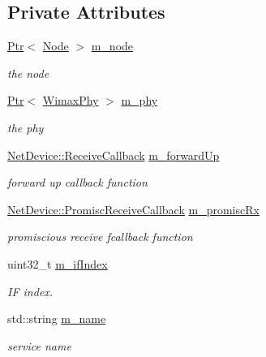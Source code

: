 \subsection*{Private Attributes}
\begin{DoxyCompactItemize}
\item 
\hyperlink{classns3_1_1Ptr}{Ptr}$<$ \hyperlink{classns3_1_1Node}{Node} $>$ \hyperlink{classns3_1_1WimaxNetDevice_ae164e0049ff0faa009a967b9e4757d92}{m\+\_\+node}
\begin{DoxyCompactList}\small\item\em the node \end{DoxyCompactList}\item 
\hyperlink{classns3_1_1Ptr}{Ptr}$<$ \hyperlink{classns3_1_1WimaxPhy}{Wimax\+Phy} $>$ \hyperlink{classns3_1_1WimaxNetDevice_a729df9652f39cacba57b0f527bc43f10}{m\+\_\+phy}
\begin{DoxyCompactList}\small\item\em the phy \end{DoxyCompactList}\item 
\hyperlink{classns3_1_1NetDevice_ad5e5e1ca187472bc2ba99575d8def568}{Net\+Device\+::\+Receive\+Callback} \hyperlink{classns3_1_1WimaxNetDevice_a03ea4a9669650b76bd7411e2c6811aea}{m\+\_\+forward\+Up}
\begin{DoxyCompactList}\small\item\em forward up callback function \end{DoxyCompactList}\item 
\hyperlink{classns3_1_1NetDevice_a427225795919f26c414bee2ea3f31ed2}{Net\+Device\+::\+Promisc\+Receive\+Callback} \hyperlink{classns3_1_1WimaxNetDevice_a18ecb5f1655bde8362564adf7c017475}{m\+\_\+promisc\+Rx}
\begin{DoxyCompactList}\small\item\em promiscious receive fcallback function \end{DoxyCompactList}\item 
uint32\+\_\+t \hyperlink{classns3_1_1WimaxNetDevice_a8483b79642afa7d64649afdde7d6314d}{m\+\_\+if\+Index}
\begin{DoxyCompactList}\small\item\em IF index. \end{DoxyCompactList}\item 
std\+::string \hyperlink{classns3_1_1WimaxNetDevice_a9983bdbb61d769071cc54069a32ac9e0}{m\+\_\+name}
\begin{DoxyCompactList}\small\item\em service name \end{DoxyCompactList}\item 

\end{DoxyCompactItemize}
